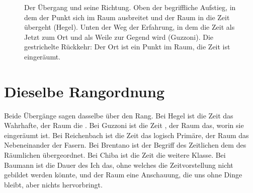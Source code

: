 \begin{figure}[htbp]
\centering
{}
\caption{Der Übergang und seine Richtung. Oben der begriffliche Aufstieg, in dem der Punkt sich im Raum ausbreitet und der Raum in die Zeit übergeht (Hegel). Unten der Weg der Erfahrung, in dem die Zeit als Jetzt zum Ort und als Weile zur Gegend wird (Guzzoni). Die gestrichelte Rückkehr: Der Ort ist ein Punkt im Raum, die Zeit ist eingeräumt.}
\label{abb:uebergang}
\end{figure}

\section{Dieselbe Rangordnung}

Beide Übergänge sagen dasselbe über den Rang. Bei Hegel ist die Zeit das Wahrhafte, der Raum die . Bei Guzzoni ist die Zeit , der Raum das, worin sie eingeräumt ist. Bei Reichenbach ist die Zeit das logisch Primäre, der Raum das Nebeneinander der Fasern. Bei Brentano ist der Begriff des Zeitlichen dem des Räumlichen übergeordnet. Bei Chiba ist die Zeit die weitere Klasse. Bei Baumann ist die Dauer des Ich das, ohne welches die Zeitvorstellung nicht gebildet werden könnte, und der Raum eine Anschauung, die uns ohne Dinge bleibt, aber nichts hervorbringt.

